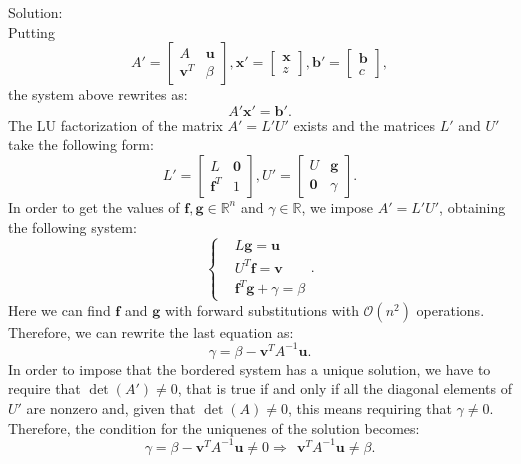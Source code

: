 \documentclass[a4paper]{report}
\newcommand{\R}{\mathbb{R}}
\numberwithin{equation}{chapter}
\begin{document}
\noindent Solution: \\
Putting 
\begin{equation}\label{key}
	A' = 
\begin{bmatrix}
	A &  \textbf{u} \\ 
	\textbf{v}^T & \beta 
\end{bmatrix}, 
\textbf{x}' = \begin{bmatrix}
	\textbf{x} \\ 
	z
\end{bmatrix}, 
\textbf{b}' = 
\begin{bmatrix}
	\textbf{b} \\ 
	c
\end{bmatrix},
\end{equation}
the system above rewrites as:
\begin{equation}\label{key}
	A' \textbf{x}' = \textbf{b}'.
\end{equation}
The LU factorization of the matrix $A' = L' U'$ exists and the matrices $L'$ and $U'$ take the following form:
\begin{equation}\label{key}
	L' = 
	\begin{bmatrix}
		L &  \textbf{0} \\ 
		\textbf{f}^T & 1 
	\end{bmatrix}, 	
U' = 
\begin{bmatrix}
U&  \textbf{g} \\ 
\textbf{0} & \gamma
\end{bmatrix}.
\end{equation}
In order to get the values of $\textbf{f}, \textbf{g}\in \R^n$ and $\gamma \in \R$, we impose $ A' = L' U'$, obtaining the following system:
\begin{equation}\label{key}
	\left\lbrace 
	\begin{split}
		& L\textbf{g} = \textbf{u}\\
		& U^T \textbf{f} = \textbf{v}\\
		&\textbf{f}^T \textbf{g} + \gamma = \beta
	\end{split} \right.  .
\end{equation}
Here we can find $\textbf{f}$ and $\textbf{g}$ with forward substitutions with $\mathcal{O}(n^2)$ operations. Therefore, we can rewrite the last equation as:
\begin{equation}\label{key}
	 \gamma = \beta - \textbf{v}^T A^{-1} \textbf{u} .
\end{equation}
In order to impose that the bordered system has a unique solution, we have to require that $\det(A') \neq 0$, that is true if and only if all the diagonal elements of $U'$ are nonzero and, given that $\det(A)\neq 0$, this means requiring that $\gamma \neq 0 $. Therefore, the condition for the uniquenes of the solution becomes:
\begin{equation}\label{key}
	\gamma = \beta - \textbf{v}^T A^{-1} \textbf{u} \neq 0 \Rightarrow \ \ \textbf{v}^T A^{-1} \textbf{u} \neq \beta.
\end{equation}


	
\end{document}
